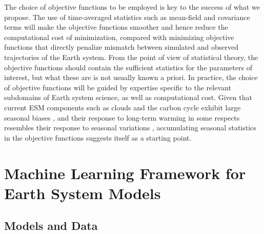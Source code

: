 \documentclass[draft]{agujournal}
\begin{document}
The choice of objective functions to be employed is key to the success of what we propose. The use of time-averaged statistics such as mean-field and covariance terms will make the objective functions smoother and hence reduce the computational cost of minimization, compared with minimizing objective functions that directly penalize mismatch between simulated and observed trajectories of the Earth system. From the point of view of statistical theory, the objective functions should contain the sufficient statistics for the parameters of interest, but what these are is not usually known a priori. In practice, the choice of objective functions will be guided by expertise specific to the relevant subdomains of Earth system science, as well as computational cost. Given that current ESM components such as clouds and the carbon cycle exhibit large seasonal biases \citep[e.g.,][]{Keppel-Aleks12a,Karlsson13a,Lin14b}, and their response to long-term warming in some respects resembles their response to seasonal variations \citep[e.g.,][]{Brient16b, Wenzel16a}, accumulating seasonal statistics in the objective functions suggests itself as a starting point.

\section{Machine Learning Framework for Earth System Models}\label{s:learning}

\subsection{Models and Data}
\end{document}
